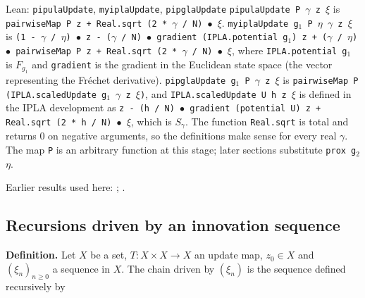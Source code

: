 \documentclass[11pt,a4paper]{report}
\begin{document}
\begin{leanbox}{Lean: \texttt{pipulaUpdate}, \texttt{myiplaUpdate}, \texttt{pipglaUpdate}}
\texttt{pipula\allowbreak{}Update P \ensuremath{\gamma} z \ensuremath{\xi}} is \texttt{pairwise\allowbreak{}Map P z + Real.\allowbreak{}sqrt (2 * \ensuremath{\gamma} /\allowbreak{} N) \ensuremath{\bullet} \ensuremath{\xi}}. \texttt{myipla\allowbreak{}Update g\ensuremath{{}_{1}} P \ensuremath{\eta} \ensuremath{\gamma} z \ensuremath{\xi}} is \texttt{(1 -\allowbreak{} \ensuremath{\gamma} /\allowbreak{} \ensuremath{\eta}) \ensuremath{\bullet} z -\allowbreak{} (\ensuremath{\gamma} /\allowbreak{} N) \ensuremath{\bullet} gradient (IPLA.\allowbreak{}potential g\ensuremath{{}_{1}}) z + (\ensuremath{\gamma} /\allowbreak{} \ensuremath{\eta}) \ensuremath{\bullet} pairwise\allowbreak{}Map P z + Real.\allowbreak{}sqrt (2 * \ensuremath{\gamma} /\allowbreak{} N) \ensuremath{\bullet} \ensuremath{\xi}}, where \texttt{IPLA.\allowbreak{}potential g\ensuremath{{}_{1}}} is \(F_{g_1}\) and \texttt{gradient} is the gradient in the Euclidean state space (the vector representing the Fréchet derivative). \texttt{pipgla\allowbreak{}Update g\ensuremath{{}_{1}} P \ensuremath{\gamma} z \ensuremath{\xi}} is \texttt{pairwise\allowbreak{}Map P (IPLA.\allowbreak{}scaled\allowbreak{}Update g\ensuremath{{}_{1}} \ensuremath{\gamma} z \ensuremath{\xi})}, and \texttt{IPLA.\allowbreak{}scaled\allowbreak{}Update U h z \ensuremath{\xi}} is defined in the IPLA development as \texttt{z -\allowbreak{} (h /\allowbreak{} N) \ensuremath{\bullet} gradient (potential U) z + Real.\allowbreak{}sqrt (2 * h /\allowbreak{} N) \ensuremath{\bullet} \ensuremath{\xi}}, which is \(S_\gamma\). The function \texttt{Real.\allowbreak{}sqrt} is total and returns \(0\) on negative arguments, so the definitions make sense for every real \(\gamma\). The map \texttt{P} is an arbitrary function at this stage; later sections substitute \texttt{prox g\ensuremath{{}_{2}} \ensuremath{\eta}}.
\end{leanbox}


Earlier results used here: \cite[Section~3.1.1]{LangevinLean2026IPLA}; \cite[Section~3.1.7]{LangevinLean2026IPLA}.
\subsection{\texorpdfstring{Recursions driven by an innovation sequence}{Recursions driven by an innovation sequence}}
\label{report-step-ProximalLangevin-Algorithms-lean-3}


\textbf{Definition.} Let \(X\) be a set, \(T:X\times X\to X\) an update map, \(z_0\in X\) and \((\xi_n)_{n\ge0}\) a sequence in \(X\). The chain driven by \((\xi_n)\) is the sequence defined recursively by
\end{document}
